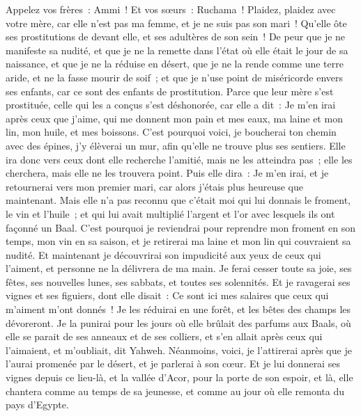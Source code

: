 \begin{multicols}{2}
Appelez vos frères~: Ammi~! Et vos sœurs~: Ruchama~!
Plaidez, plaidez avec votre mère, car elle n'est pas ma femme, et je ne suis pas son mari~! Qu'elle ôte ses prostitutions de devant elle, et ses adultères de son sein~!
De peur que je ne manifeste sa nudité, et que je ne la remette dans l'état où elle était le jour de sa naissance, et que je ne la réduise en désert, que je ne la rende comme une terre aride, et ne la fasse mourir de soif~;
et que je n'use point de miséricorde envers ses enfants, car ce sont des enfants de prostitution.
Parce que leur mère s'est prostituée, celle qui les a conçus s'est déshonorée, car elle a dit~: Je m'en irai après ceux que j'aime, qui me donnent mon pain et mes eaux, ma laine et mon lin, mon huile, et mes boissons.
C'est pourquoi voici, je boucherai ton chemin avec des épines, j'y élèverai un mur, afin qu'elle ne trouve plus ses sentiers.
Elle ira donc vers ceux dont elle recherche l'amitié, mais ne les atteindra pas~; elle les cherchera, mais elle ne les trouvera point. Puis elle dira~: Je m'en irai, et je retournerai vers mon premier mari, car alors j'étais plus heureuse que maintenant.
Mais elle n'a pas reconnu que c'était moi qui lui donnais le froment, le vin et l'huile~; et qui lui avait multiplié l'argent et l'or avec lesquels ils ont façonné un Baal.
C'est pourquoi je reviendrai pour reprendre mon froment en son temps, mon vin en sa saison, et je retirerai ma laine et mon lin qui couvraient sa nudité.
Et maintenant je découvrirai son impudicité aux yeux de ceux qui l'aiment, et personne ne la délivrera de ma main.
Je ferai cesser toute sa joie, ses fêtes, ses nouvelles lunes, ses sabbats, et toutes ses solennités.
Et je ravagerai ses vignes et ses figuiers, dont elle disait~: Ce sont ici mes salaires que ceux qui m'aiment m'ont donnés~! Je les réduirai en une forêt, et les bêtes des champs les dévoreront.
Je la punirai pour les jours où elle brûlait des parfums aux Baals, où elle se parait de ses anneaux et de ses colliers, et s'en allait après ceux qui l'aimaient, et m'oubliait, dit Yahweh.
Néanmoins, voici, je l'attirerai après que je l'aurai promenée par le désert, et je parlerai à son cœur.
Et je lui donnerai ses vignes depuis ce lieu-là, et la vallée d'Acor, pour la porte de son espoir, et là, elle chantera comme au temps de sa jeunesse, et comme au jour où elle remonta du pays d'Egypte.

\end{multicols}
